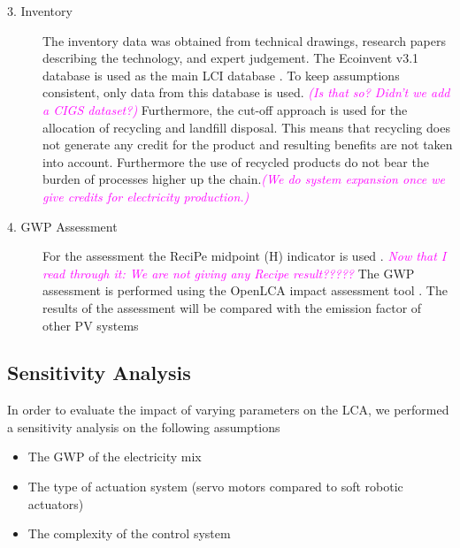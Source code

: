 \begin{description}
\item[3. Inventory] The inventory data was obtained from technical drawings, research papers describing the technology, and expert judgement. The Ecoinvent v3.1 database is used as the main LCI database \cite{frischknecht2005ecoinvent}. To keep assumptions consistent, only data from this database is used. \textcolor{magenta}{\textit{(Is that so? Didn't we add a CIGS dataset?)}} Furthermore, the cut-off approach is used for the allocation of recycling and landfill disposal. This means that recycling does not generate any credit for the product and resulting benefits are not taken into account. Furthermore the use of recycled products do not bear the burden of processes higher up the chain.\textcolor{magenta}{\textit{(We do system expansion once we give credits for electricity production.)}}\\



\item[4. GWP Assessment] For the assessment the ReciPe midpoint (H) indicator is used \cite{zelm2009recipe}. \textcolor{magenta}{\textit{Now that I read through it: We are not giving any Recipe result?????}} The GWP assessment is performed using the OpenLCA impact assessment tool \cite{ciroth2007ict}. The results of the assessment will be compared with the emission factor of other PV systems \cite{raugei2007life}\\


\end{description}

\subsection{Sensitivity Analysis}

In order to evaluate the impact of varying parameters on the LCA, we performed a sensitivity analysis on the following assumptions
\begin{itemize}
\item The GWP of the electricity mix
\item The type of actuation system (servo motors compared to soft robotic actuators)
\item The complexity of the control system
\end{itemize}

